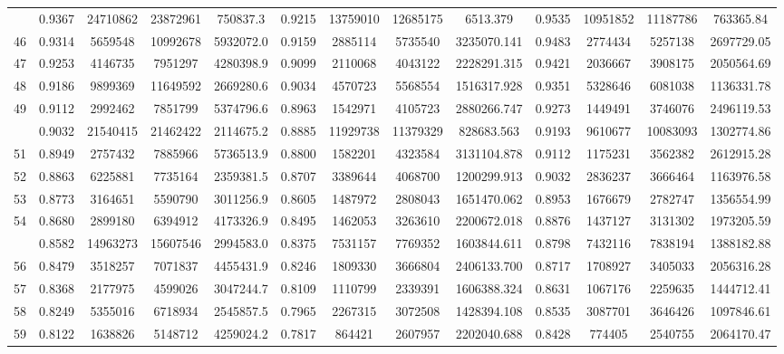 \documentclass[
  12pt,
]{article}
\begin{document}
\begin{longtable}[t]{lcccccccccccc}
\addlinespace
45 & 0.9367 & 24710862 & 23872961 & 750837.3 & 0.9215 & 13759010 & 12685175 & 6513.379 & 0.9535 & 10951852 & 11187786 & 763365.84\\
46 & 0.9314 & 5659548 & 10992678 & 5932072.0 & 0.9159 & 2885114 & 5735540 & 3235070.141 & 0.9483 & 2774434 & 5257138 & 2697729.05\\
47 & 0.9253 & 4146735 & 7951297 & 4280398.9 & 0.9099 & 2110068 & 4043122 & 2228291.315 & 0.9421 & 2036667 & 3908175 & 2050564.69\\
48 & 0.9186 & 9899369 & 11649592 & 2669280.6 & 0.9034 & 4570723 & 5568554 & 1516317.928 & 0.9351 & 5328646 & 6081038 & 1136331.78\\
49 & 0.9112 & 2992462 & 7851799 & 5374796.6 & 0.8963 & 1542971 & 4105723 & 2880266.747 & 0.9273 & 1449491 & 3746076 & 2496119.53\\
\addlinespace
50 & 0.9032 & 21540415 & 21462422 & 2114675.2 & 0.8885 & 11929738 & 11379329 & 828683.563 & 0.9193 & 9610677 & 10083093 & 1302774.86\\
51 & 0.8949 & 2757432 & 7885966 & 5736513.9 & 0.8800 & 1582201 & 4323584 & 3131104.878 & 0.9112 & 1175231 & 3562382 & 2612915.28\\
52 & 0.8863 & 6225881 & 7735164 & 2359381.5 & 0.8707 & 3389644 & 4068700 & 1200299.913 & 0.9032 & 2836237 & 3666464 & 1163976.58\\
53 & 0.8773 & 3164651 & 5590790 & 3011256.9 & 0.8605 & 1487972 & 2808043 & 1651470.062 & 0.8953 & 1676679 & 2782747 & 1356554.99\\
54 & 0.8680 & 2899180 & 6394912 & 4173326.9 & 0.8495 & 1462053 & 3263610 & 2200672.018 & 0.8876 & 1437127 & 3131302 & 1973205.59\\
\addlinespace
55 & 0.8582 & 14963273 & 15607546 & 2994583.0 & 0.8375 & 7531157 & 7769352 & 1603844.611 & 0.8798 & 7432116 & 7838194 & 1388182.88\\
56 & 0.8479 & 3518257 & 7071837 & 4455431.9 & 0.8246 & 1809330 & 3666804 & 2406133.700 & 0.8717 & 1708927 & 3405033 & 2056316.28\\
57 & 0.8368 & 2177975 & 4599026 & 3047244.7 & 0.8109 & 1110799 & 2339391 & 1606388.324 & 0.8631 & 1067176 & 2259635 & 1444712.41\\
58 & 0.8249 & 5355016 & 6718934 & 2545857.5 & 0.7965 & 2267315 & 3072508 & 1428394.108 & 0.8535 & 3087701 & 3646426 & 1097846.61\\
59 & 0.8122 & 1638826 & 5148712 & 4259024.2 & 0.7817 & 864421 & 2607957 & 2202040.688 & 0.8428 & 774405 & 2540755 & 2064170.47\\

\end{longtable}
\end{document}
